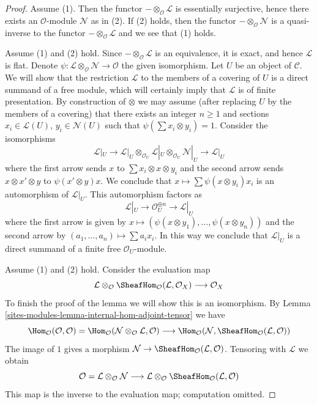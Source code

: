 \begin{proof}
Assume (1). Then the functor $- \otimes_\mathcal{O} \mathcal{L}$
is essentially surjective, hence there exists an $\mathcal{O}$-module
$\mathcal{N}$ as in (2). If (2) holds, then the functor
$- \otimes_\mathcal{O} \mathcal{N}$ is a quasi-inverse
to the functor $- \otimes_\mathcal{O} \mathcal{L}$ and
we see that (1) holds.

\medskip\noindent
Assume (1) and (2) hold. Since $- \otimes_\mathcal{O} \mathcal{L}$ is an
equivalence, it is exact, and hence $\mathcal{L}$ is flat. Denote
$\psi : \mathcal{L} \otimes_\mathcal{O} \mathcal{N} \to \mathcal{O}$
the given isomorphism. Let $U$ be an object of $\mathcal{C}$.
We will show that the restriction $\mathcal{L}$ to the members
of a covering of $U$ is a direct summand of a free module, which will
certainly imply that $\mathcal{L}$ is of finite presentation.
By construction of $\otimes$ we may assume (after replacing
$U$ by the members of a covering) that there exists
an integer $n \geq 1$ and sections $x_i \in \mathcal{L}(U)$,
$y_i \in \mathcal{N}(U)$ such that $\psi(\sum x_i \otimes y_i) = 1$.
Consider the isomorphisms
$$
\mathcal{L}|_U \to
\mathcal{L}|_U \otimes_{\mathcal{O}_U}
\mathcal{L}|_U \otimes_{\mathcal{O}_U} \mathcal{N}|_U \to \mathcal{L}|_U
$$
where the first arrow sends $x$ to $\sum x_i \otimes x \otimes y_i$
and the second arrow sends $x \otimes x' \otimes y$ to $\psi(x' \otimes y)x$.
We conclude that $x \mapsto \sum \psi(x \otimes y_i)x_i$ is
an automorphism of $\mathcal{L}|_U$. This automorphism factors as
$$
\mathcal{L}|_U \to \mathcal{O}_U^{\oplus n} \to \mathcal{L}|_U
$$
where the first arrow is given by
$x \mapsto (\psi(x \otimes y_1), \ldots, \psi(x \otimes y_n))$
and the second arrow by $(a_1, \ldots, a_n) \mapsto \sum a_i x_i$.
In this way we conclude that $\mathcal{L}|_U$ is a direct summand
of a finite free $\mathcal{O}_U$-module.

\medskip\noindent
Assume (1) and (2) hold. Consider the evaluation map
$$
\mathcal{L} \otimes_\mathcal{O}
\SheafHom_\mathcal{O}(\mathcal{L}, \mathcal{O}_X)
\longrightarrow \mathcal{O}_X
$$
To finish the proof of the lemma we will show this is an isomorphism.
By Lemma \ref{sites-modules-lemma-internal-hom-adjoint-tensor} we have
$$
\Hom_\mathcal{O}(\mathcal{O}, \mathcal{O}) =
\Hom_\mathcal{O}
(\mathcal{N} \otimes_\mathcal{O} \mathcal{L}, \mathcal{O})
\longrightarrow
\Hom_\mathcal{O}
(\mathcal{N}, \SheafHom_\mathcal{O}(\mathcal{L}, \mathcal{O}))
$$
The image of $1$ gives a morphism
$\mathcal{N} \to \SheafHom_\mathcal{O}(\mathcal{L}, \mathcal{O})$.
Tensoring with $\mathcal{L}$ we obtain
$$
\mathcal{O} = \mathcal{L} \otimes_\mathcal{O} \mathcal{N}
\longrightarrow
\mathcal{L} \otimes_\mathcal{O} \SheafHom_\mathcal{O}(\mathcal{L}, \mathcal{O})
$$
This map is the inverse to the evaluation map; computation omitted.
\end{proof}

